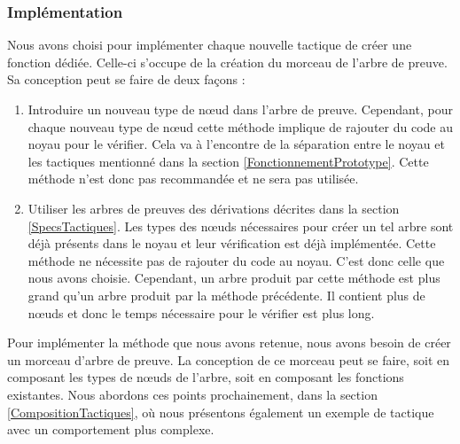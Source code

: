 \documentclass[titlepage,draft]{article}
\begin{document}
\subsubsection{Implémentation}
Nous avons choisi pour implémenter chaque nouvelle tactique de créer une fonction dédiée. Celle-ci s'occupe de la création du morceau de l'arbre de preuve. Sa conception peut se faire de deux façons :
\begin{enumerate}
    \item Introduire un nouveau type de nœud dans l'arbre de preuve. Cependant, pour chaque nouveau type de nœud cette méthode implique de rajouter du code au noyau pour le vérifier. Cela va à l'encontre de la séparation entre le noyau et les tactiques mentionné dans la section \ref{FonctionnementPrototype}. Cette méthode n'est donc pas recommandée et ne sera pas utilisée.
    \item Utiliser les arbres de preuves des dérivations décrites dans la section \ref{SpecsTactiques}. Les types des nœuds nécessaires pour créer un tel arbre sont déjà présents dans le noyau et leur vérification est déjà implémentée. Cette méthode ne nécessite pas de rajouter du code au noyau. C'est donc celle que nous avons choisie. Cependant, un arbre produit par cette méthode est plus grand qu'un arbre produit par la méthode précédente. Il contient plus de nœuds et donc le temps nécessaire pour le vérifier est plus long.
\end{enumerate}

Pour implémenter la méthode que nous avons retenue, nous avons besoin de créer un morceau d'arbre de preuve. La conception de ce morceau peut se faire, soit en composant les types de nœuds de l'arbre, soit en composant les fonctions existantes. Nous abordons ces points prochainement, dans la section \ref{CompositionTactiques}, où nous présentons également un exemple de tactique avec un comportement plus complexe.
\end{document}
